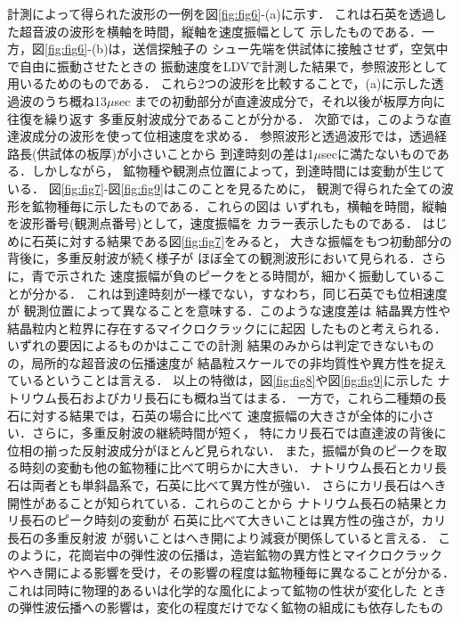 ﻿%
計測によって得られた波形の一例を図\ref{fig:fig6}-(a)に示す．
これは石英を透過した超音波の波形を横軸を時間，縦軸を速度振幅として
示したものである．一方，図\ref{fig:fig6}-(b)は，送信探触子の
シュー先端を供試体に接触させず，空気中で自由に振動させたときの
振動速度をLDVで計測した結果で，参照波形として用いるためのものである．
これら2つの波形を比較することで，(a)に示した透過波のうち概ね13$\mu$sec
までの初動部分が直達波成分で，それ以後が板厚方向に往復を繰り返す
多重反射波成分であることが分かる．
次節では，このような直達波成分の波形を使って位相速度を求める．
参照波形と透過波形では，透過経路長(供試体の板厚)が小さいことから
到達時刻の差は1$\mu$secに満たないものである．しかしながら，
鉱物種や観測点位置によって，到達時間には変動が生じている．
図\ref{fig:fig7}-図\ref{fig:fig9}はこのことを見るために，
観測で得られた全ての波形を鉱物種毎に示したものである．これらの図は
いずれも，横軸を時間，縦軸を波形番号(観測点番号)として，速度振幅を
カラー表示したものである．
はじめに石英に対する結果である図\ref{fig:fig7}をみると，
大きな振幅をもつ初動部分の背後に，多重反射波が続く様子が
ほぼ全ての観測波形において見られる．さらに，青で示された
速度振幅が負のピークをとる時間が，細かく振動していることが分かる．
これは到達時刻が一様でない，すなわち，同じ石英でも位相速度が
観測位置によって異なることを意味する．このような速度差は
結晶異方性や結晶粒内と粒界に存在するマイクロクラックにに起因
したものと考えられる．いずれの要因によるものかはここでの計測
結果のみからは判定できないものの，局所的な超音波の伝播速度が
結晶粒スケールでの非均質性や異方性を捉えているということは言える．
以上の特徴は，図\ref{fig:fig8}や図\ref{fig:fig9}に示した
ナトリウム長石およびカリ長石にも概ね当てはまる．
一方で，これら二種類の長石に対する結果では，石英の場合に比べて
速度振幅の大きさが全体的に小さい．さらに，多重反射波の継続時間が短く，
特にカリ長石では直達波の背後に位相の揃った反射波成分がほとんど見られない．
また，振幅が負のピークを取る時刻の変動も他の鉱物種に比べて明らかに大きい．
ナトリウム長石とカリ長石は両者とも単斜晶系で，石英に比べて異方性が強い．
さらにカリ長石はへき開性があることが知られている．これらのことから
ナトリウム長石の結果とカリ長石のピーク時刻の変動が
石英に比べて大きいことは異方性の強さが，カリ長石の多重反射波
が弱いことはへき開により減衰が関係していると言える．
このように，花崗岩中の弾性波の伝播は，造岩鉱物の異方性とマイクロクラック
やへき開による影響を受け，その影響の程度は鉱物種毎に異なることが分かる．
これは同時に物理的あるいは化学的な風化によって鉱物の性状が変化した
ときの弾性波伝播への影響は，変化の程度だけでなく鉱物の組成にも依存したもの
